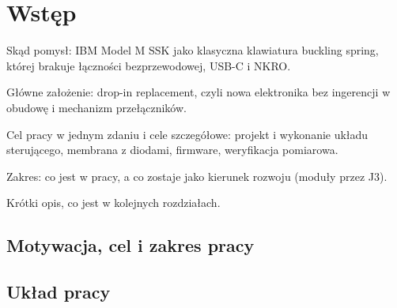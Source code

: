 \chapter{Wstęp}\label{ch:wstep}
\begin{zawartosc}
  \item Skąd pomysł: IBM Model M SSK jako klasyczna klawiatura buckling spring, której brakuje łączności bezprzewodowej, USB-C i NKRO.
  \item Główne założenie: drop-in replacement, czyli nowa elektronika bez ingerencji w obudowę i mechanizm przełączników.
  \item Cel pracy w jednym zdaniu i cele szczegółowe: projekt i wykonanie układu sterującego, membrana z diodami, firmware, weryfikacja pomiarowa.
  \item Zakres: co jest w pracy, a co zostaje jako kierunek rozwoju (moduły przez J3).
  \item Krótki opis, co jest w kolejnych rozdziałach.
\end{zawartosc}

\section{Motywacja, cel i zakres pracy}\label{sec:cel}

\section{Układ pracy}\label{sec:uklad}

